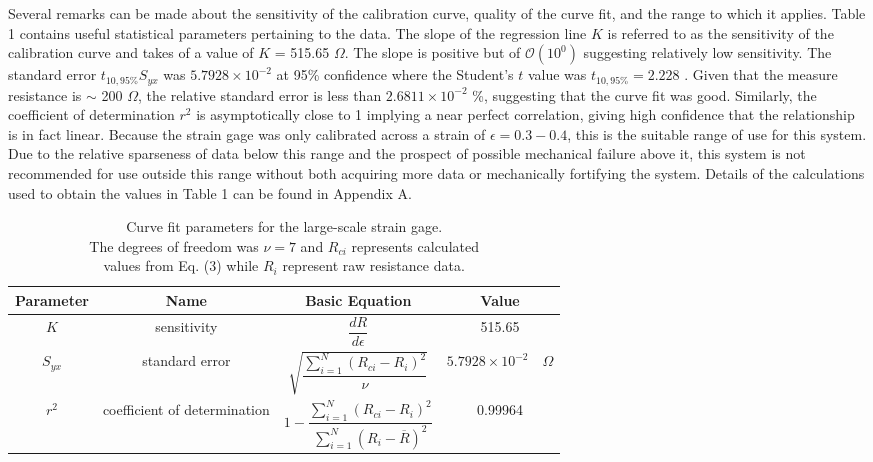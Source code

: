 \documentclass[12pt, letterpaper]{article}
\begin{document}
Several remarks can be made about the sensitivity of the calibration curve,
quality of the curve fit, and the range to which it applies. Table 1 contains
useful statistical parameters pertaining to the data. The slope of the
regression line $K$ is referred to as the sensitivity of the calibration curve
and takes of a value of $K$ = 515.65 $\Omega$. The slope is positive but of
$\mathcal{O}(10^0)$ suggesting relatively low sensitivity. The standard error
$t_{10,95\%} S_{yx}$ was $5.7928 \times 10^{-2}$ at 95\%  confidence where the
Student's $t$ value was $t_{10,95\%} = 2.228$ \cite{dunn}. Given that the measure
resistance is $\sim$ 200 $\Omega$, the relative standard error is less than
$2.6811 \times 10^{-2}$  \%, suggesting that the curve fit was good.  Similarly, the
coefficient of determination $r^2$ is asymptotically close to 1 implying a
near perfect correlation, giving high confidence that the relationship is in
fact linear.  Because the strain gage was only calibrated across a strain of
$\epsilon = 0.3 - 0.4$, this is the suitable range of use for this system. Due
to the relative sparseness of data below this range and the prospect of
possible mechanical failure above it, this system is not recommended for use
outside this range without both acquiring more data or mechanically fortifying
the system. Details of the calculations used to obtain the values in Table 1
can be found in Appendix A.

\begin{table}[h!]
\centering
   \caption{Curve fit parameters for the large-scale strain gage. \\
      The degrees of freedom was $\nu =7$ and $R_{ci}$ represents calculated \\
   values from Eq. (3) while $R_i$ represent raw resistance data.}
   \begin{tabular}{ c c c c } \toprule
      Parameter & Name & Basic Equation & Value \\ \midrule
      $K$ & sensitivity & $\dfrac{dR}{d\epsilon}$ &  515.65 \\ \midrule
      $S_{yx}$ & standard error & $\sqrt{\dfrac{\sum_{i=1}^N (R_{ci} - R_i)^2}{\nu}}$ &
      $5.7928 \times 10^{-2} \quad {\Omega}$  \\  \midrule
      $r^2$ & coefficient of determination & $1 - \dfrac{\sum_{i=1}^N (R_{ci}
   - R_i)^2}{\sum_{i=1}^N(R_i - \overline{R})^2}$ & 0.99964 \\ \bottomrule
\end{tabular}
\label{table1}
\end{table}
\end{document}
